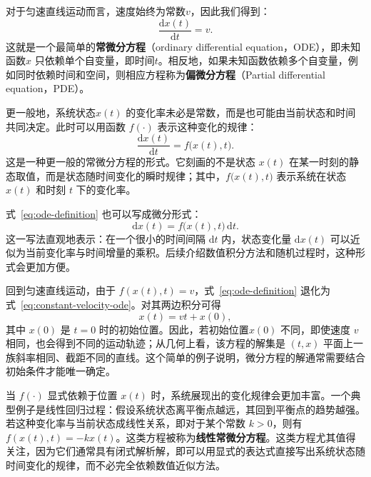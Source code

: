 \documentclass[UTF8,a4paper,zihao=-4,oneside,openany]{ctexbook}
\begin{document}
对于匀速直线运动而言，速度始终为常数\(v\)，因此我们得到：
\begin{equation}
\frac{\mathrm{d}x(t)}{\mathrm{d}t}
=
v.
\label{eq:constant-velocity-ode}
\end{equation}
这就是一个最简单的\textbf{常微分方程}（ordinary differential equation，ODE），即未知函数\(x\) 只依赖单个自变量，即时间\(t\)。相反地，如果未知函数依赖多个自变量，例如同时依赖时间和空间，则相应方程称为\textbf{偏微分方程}（Partial differential equation，PDE）。

更一般地，系统状态\(x(t)\) 的变化率未必是常数，而是也可能由当前状态和时间共同决定。此时可以用函数 \(f(\cdot)\) 表示这种变化的规律：
\begin{equation}
\frac{\mathrm{d}x(t)}{\mathrm{d}t}
=
f\bigl(x(t),t\bigr).
\label{eq:ode-definition}
\end{equation}
这是一种更一般的常微分方程的形式。它刻画的不是状态 \(x(t)\) 在某一时刻的静态取值，而是状态随时间变化的瞬时规律；其中，\(f\bigl(x(t),t\bigr)\) 表示系统在状态 \(x(t)\) 和时刻 \(t\) 下的变化率。

式~\eqref{eq:ode-definition} 也可以写成微分形式：
\begin{equation}
\mathrm{d}x(t)
=
f\bigl(x(t),t\bigr)\,\mathrm{d}t.
\label{eq:ode-differential-form}
\end{equation}
这一写法直观地表示：在一个很小的时间间隔 \(\mathrm{d}t\) 内，状态变化量 \(\mathrm{d}x(t)\) 可以近似为当前变化率与时间增量的乘积。后续介绍数值积分方法和随机过程时，这种形式会更加方便。

回到匀速直线运动，由于 \(f(x(t),t)=v\)，式~\eqref{eq:ode-definition} 退化为式~\eqref{eq:constant-velocity-ode}。对其两边积分可得
\begin{equation}
x(t)
=
vt+x(0),
\label{eq:uniform-linear-motion}
\end{equation}
其中 \(x(0)\) 是 \(t=0\) 时的初始位置。因此，若初始位置\(x(0)\) 不同，即使速度 \(v\) 相同，也会得到不同的运动轨迹；从几何上看，该方程的解集是 \((t,x)\) 平面上一族斜率相同、截距不同的直线。这个简单的例子说明，微分方程的解通常需要结合初始条件才能唯一确定。

当 \(f(\cdot)\) 显式依赖于位置 \(x(t)\) 时，系统展现出的变化规律会更加丰富。一个典型例子是线性回归过程：假设系统状态离平衡点越远，其回到平衡点的趋势越强。若这种变化率与当前状态成线性关系，即对于某个常数 \(k > 0\)，则有 \(f(x(t),t)=-kx(t)\)。这类方程被称为\textbf{线性常微分方程}。这类方程尤其值得关注，因为它们通常具有闭式解析解，即可以用显式的表达式直接写出系统状态随时间变化的规律，而不必完全依赖数值近似方法。 
\end{document}
